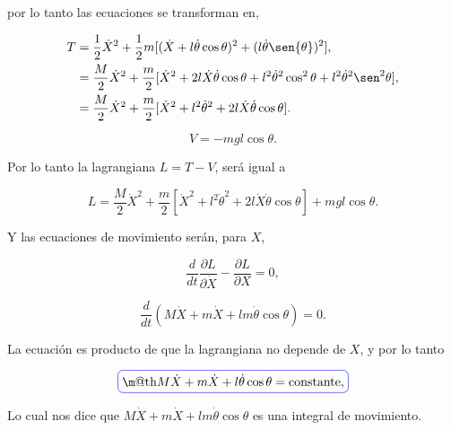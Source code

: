 \documentclass[a4paper,10pt]{article}
\makeatletter
\numberwithin{equation}{section}
\newcommand*{\boxcolor}{blue}
\renewcommand{\boxed}[1]{\textcolor{\boxcolor}{%
\tikz[baseline={([yshift=-1ex]current bounding box.center)}] \node [rectangle, minimum width=1ex,rounded corners,draw] {\normalcolor\m@th$\displaystyle#1$};}}
\makeatother
\begin{document}
por lo tanto las ecuaciones  se transforman en,

\begin{align}
 \begin{split}
  T &= \frac{1}{2} \dot{X}^2 + \frac{1}{2}m[(\dot{X}+ l \dot{\theta} \cos{\theta})^2 +
    (l \dot{\theta} \sen{\theta})^2], \\
    &= \frac{M}{2}\dot{X}^2 + \frac{m}{2}[\dot{X}^2 + 2l\dot{X}\dot{\theta}\cos{\theta} + 
    l^2 \dot{\theta}^2 \cos^2{\theta} + l^2 \dot{\theta}^2 \sen^2{\theta}], \\
    &= \frac{M}{2}\dot{X}^2 + \frac{m}{2}[\dot{X}^2 + l^2 \dot{\theta}^2 + 
    2l\dot{X}\dot{\theta}\cos{\theta}].
 \end{split}
\end{align}

\begin{equation}
 V = -mgl \cos{\theta}.
\end{equation}

Por lo tanto la lagrangiana $L = T - V$, será igual a 

\begin{equation}
 L = \frac{M}{2}\dot{X}^2 + \frac{m}{2}[\dot{X}^2 + l^2 \dot{\theta}^2 + 
    2l\dot{X}\dot{\theta}\cos{\theta}] + mgl \cos{\theta}.
\end{equation}

Y las ecuaciones de movimiento serán, para $X$,

\begin{equation}
 \frac{d}{dt}\frac{\partial L}{\partial \dot{X}} - \frac{\partial L}{\partial X} = 0,
\end{equation}

\begin{equation}
 \frac{d}{dt} (M \dot{X} + m \dot{X} + lm\dot{\theta}\cos{\theta}) = 0.
 \label{eq:pendu7}
\end{equation}

La ecuación  es producto de que la lagrangiana no depende de $X$, y por 
lo tanto

\begin{equation}
 \boxed{M \dot{X} + m \dot{X} + l\dot{\theta}\cos{\theta} = \text{constante},}
\end{equation}

Lo cual nos dice que $M \dot{X} + m \dot{X} + lm\dot{\theta}\cos{\theta}$ es una integral 
de movimiento.

\vspace{.3cm}
\end{document}
